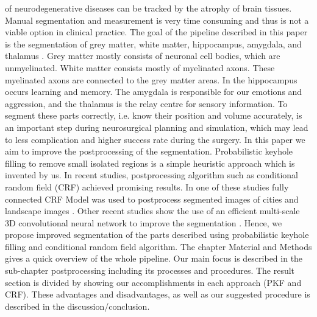 \documentclass[journal]{IEEEtran}
\begin{document}
 of neurodegenerative diseases can be tracked by the atrophy of brain tissues.
Manual segmentation and measurement is very time consuming and thus is not a viable option in clinical practice. 
The goal of the pipeline described in this paper is the segmentation of grey matter, white matter, hippocampus, amygdala, and thalamus . 
Grey matter mostly consists of neuronal cell bodies, which are unmyelinated. White matter consists mostly of myelinated axons. These myelinated axons are connected to the grey matter areas. In the hippocampus occurs learning and memory. The amygdala is responsible for our emotions and aggression, and the thalamus is the relay centre for sensory information. To segment these parts correctly, i.e. know their position and volume accurately, is an important step during neurosurgical planning and simulation, which may lead to less complication and higher success rate during the surgery. 
In this paper we aim to improve the postprocessing of the segmentation. Probabilistic keyhole filling to remove small isolated regions is a simple heuristic approach which is invented by us. In recent studies, postprocessing algorithm such as conditional random field (CRF) achieved promising results. In one of these studies fully connected CRF Model was used to postprocess segmented images of cities and landscape images \cite{Liu2018}. Other recent studies show the use of an efficient multi-scale 3D convolutional neural network to improve the segmentation \cite{Kamnitsas2017}.  Hence, we propose improved segmentation of the parts described using probabilistic keyhole filling and conditional random field algorithm. The chapter Material and Methods gives a quick overview of the whole pipeline. Our main focus is described in the sub-chapter postprocessing including its processes and procedures. The result section is divided by showing our accomplishments in each approach (PKF and CRF). These advantages and disadvantages, as well as our suggested procedure is described in the discussion/conclusion.
\end{document}
